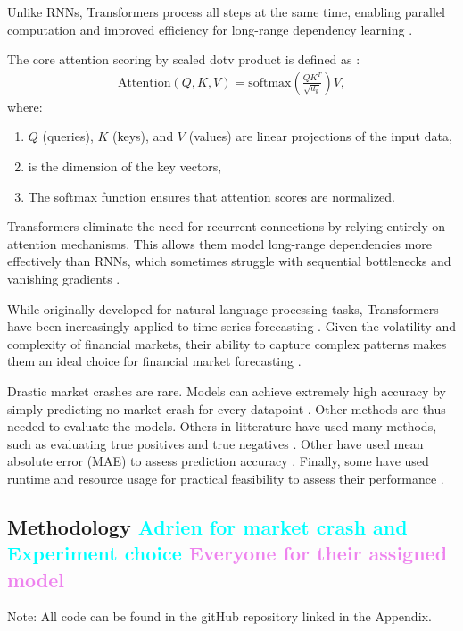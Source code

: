 \documentclass[12pt, letterpaper]{article}
\begin{document}
    Unlike RNNs, Transformers process all steps at the same time, enabling parallel computation and improved efficiency for long-range dependency learning \cite{vaswani2017attention}.

The core attention scoring by scaled dotv product is defined as \cite{vaswani2017attention}:
{\small \begin{align*} \text{Attention}(Q, K, V) = \text{softmax}\left(\frac{QK^T}{\sqrt{d_k}}\right)V, \end{align*} }
where:
\begin{enumerate}[label=-] \item $Q$ (queries), $K$ (keys), and $V$ (values) are linear projections of the input data,
\item  is the dimension of the key vectors,
\item The softmax function ensures that attention scores are normalized.
\end{enumerate}

Transformers eliminate the need for recurrent connections by relying entirely on attention mechanisms. This allows them model long-range dependencies more effectively than RNNs, which sometimes struggle with sequential bottlenecks and vanishing gradients \cite{vaswani2017attention}.

While originally developed for natural language processing tasks, Transformers have been increasingly applied to time-series forecasting \cite{zeng2023financial}.
Given the volatility and complexity of financial markets, their ability to capture complex patterns makes them an ideal choice for financial market forecasting \cite{wu2020deep}.
\newline

    Drastic market crashes are rare. Models can achieve extremely high accuracy by simply predicting no market crash for every datapoint \cite{market_infrequent}. Other methods are thus needed to evaluate the models. Others in litterature have used many methods, such as evaluating true positives and true negatives \cite{true_positive}. Other have used mean absolute error (MAE) to assess prediction accuracy \cite{hyndman2018}. Finally, some have used runtime and resource usage for practical feasibility to assess their performance \cite{lim2021temporal}.

\subsection*{Methodology \textcolor{cyan}{Adrien for market crash and Experiment choice} \textcolor{violet}{Everyone for their assigned model}}
Note: All code can be found in the gitHub repository linked in the Appendix.
\end{document}
